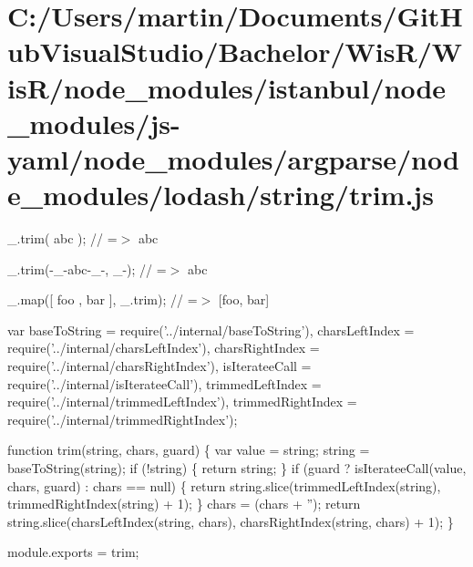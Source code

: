 \hypertarget{_c_1_2_users_2martin_2_documents_2_git_hub_visual_studio_2_bachelor_2_wis_r_2_wis_r_2node_moduleb121566d55e4aafe59056978181c8a8c}{}\section{C\+:/\+Users/martin/\+Documents/\+Git\+Hub\+Visual\+Studio/\+Bachelor/\+Wis\+R/\+Wis\+R/node\+\_\+modules/istanbul/node\+\_\+modules/js-\/yaml/node\+\_\+modules/argparse/node\+\_\+modules/lodash/string/trim.\+js}
\+\_\+.\+trim(\textquotesingle{} abc \textquotesingle{}); // =$>$ \textquotesingle{}abc\textquotesingle{}

\+\_\+.\+trim(\textquotesingle{}-\/\+\_\+-\/abc-\/\+\_\+-\/\textquotesingle{}, \textquotesingle{}\+\_\+-\/\textquotesingle{}); // =$>$ \textquotesingle{}abc\textquotesingle{}

\+\_\+.\+map(\mbox{[}\textquotesingle{} foo \textquotesingle{}, \textquotesingle{} bar \textquotesingle{}\mbox{]}, \+\_\+.\+trim); // =$>$ \mbox{[}\textquotesingle{}foo\textquotesingle{}, \textquotesingle{}bar\textquotesingle{}\mbox{]}


\begin{DoxyCodeInclude}
var baseToString = require(\textcolor{stringliteral}{'../internal/baseToString'}),
    charsLeftIndex = require(\textcolor{stringliteral}{'../internal/charsLeftIndex'}),
    charsRightIndex = require(\textcolor{stringliteral}{'../internal/charsRightIndex'}),
    isIterateeCall = require(\textcolor{stringliteral}{'../internal/isIterateeCall'}),
    trimmedLeftIndex = require(\textcolor{stringliteral}{'../internal/trimmedLeftIndex'}),
    trimmedRightIndex = require(\textcolor{stringliteral}{'../internal/trimmedRightIndex'});

\textcolor{keyword}{function} trim(\textcolor{keywordtype}{string}, chars, guard) \{
  var value = string;
  \textcolor{keywordtype}{string} = baseToString(\textcolor{keywordtype}{string});
  \textcolor{keywordflow}{if} (!\textcolor{keywordtype}{string}) \{
    \textcolor{keywordflow}{return} string;
  \}
  \textcolor{keywordflow}{if} (guard ? isIterateeCall(value, chars, guard) : chars == null) \{
    \textcolor{keywordflow}{return} \textcolor{keywordtype}{string}.slice(trimmedLeftIndex(\textcolor{keywordtype}{string}), trimmedRightIndex(\textcolor{keywordtype}{string}) + 1);
  \}
  chars = (chars + \textcolor{stringliteral}{''});
  \textcolor{keywordflow}{return} \textcolor{keywordtype}{string}.slice(charsLeftIndex(\textcolor{keywordtype}{string}, chars), charsRightIndex(\textcolor{keywordtype}{string}, chars) + 1);
\}

module.exports = trim;
\end{DoxyCodeInclude}
 